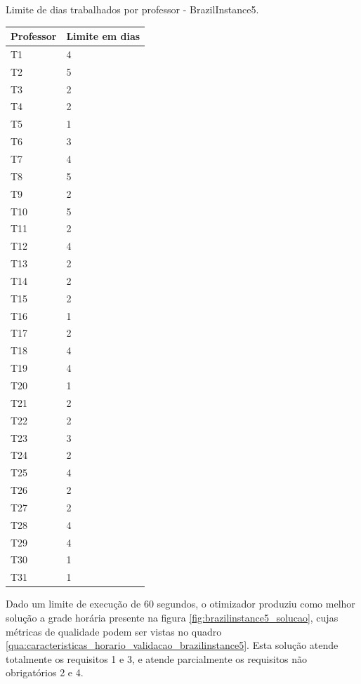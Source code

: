 \begin{quadro}[h]
	\centering
	\caption{Limite de dias trabalhados por professor - BrazilInstance5.\label{qua:limites_dias_trabalhados_brazilinstance5}}
	\begin{tabular}{|p{2cm}|p{4cm}|}
		\hline
		\textbf{Professor} & \textbf{Limite em dias} \\
		\hline
		T1 & 4 \\
		\hline
		T2 & 5 \\
		\hline
		T3 & 2 \\
		\hline
		T4 & 2 \\
		\hline
		T5 & 1 \\
		\hline
		T6 & 3 \\
		\hline
		T7 & 4 \\
		\hline
		T8 & 5 \\
		\hline
		T9 & 2 \\
		\hline
		T10 & 5 \\
		\hline
		T11 & 2 \\
		\hline
		T12 & 4 \\
		\hline
		T13 & 2 \\
		\hline
		T14 & 2 \\
		\hline
		T15 & 2 \\
		\hline
		T16 & 1 \\
		\hline
		T17 & 2 \\
		\hline
		T18 & 4 \\
		\hline
		T19 & 4 \\
		\hline
		T20 & 1 \\
		\hline
		T21 & 2 \\
		\hline
		T22 & 2 \\
		\hline
		T23 & 3 \\
		\hline
		T24 & 2 \\
		\hline
		T25 & 4 \\
		\hline
		T26 & 2 \\
		\hline
		T27 & 2 \\
		\hline
		T28 & 4 \\
		\hline
		T29 & 4 \\
		\hline
		T30 & 1 \\
		\hline
		T31 & 1 \\
		\hline
	\end{tabular}
\end{quadro}

Dado um limite de execução de 60 segundos, o otimizador produziu como melhor solução a grade horária presente na figura \ref{fig:brazilinstance5_solucao}, cujas métricas de qualidade podem ser vistas no quadro \ref{qua:caracteristicas_horario_validacao_brazilinstance5}. Esta solução atende totalmente os requisitos 1 e 3, e atende parcialmente os requisitos não obrigatórios 2 e 4.


